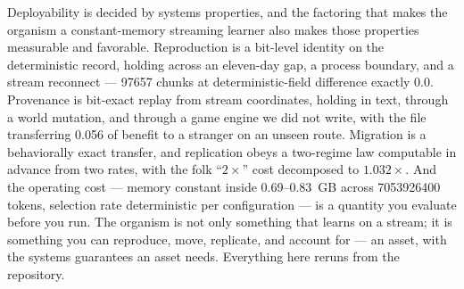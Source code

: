\documentclass[11pt]{article}
\theoremstyle{definition}
\begin{document}
Deployability is decided by systems properties, and the factoring that makes
the organism a constant-memory streaming learner also makes those properties
measurable and favorable. Reproduction is a bit-level identity on the
deterministic record, holding across an eleven-day gap, a process boundary, and
a stream reconnect --- \num{97657} chunks at deterministic-field difference
exactly \num{0.0}. Provenance is bit-exact replay from stream coordinates,
holding in text, through a world mutation, and through a game engine we did not
write, with the file transferring \num{0.056} of benefit to a stranger on an
unseen route. Migration is a behaviorally exact transfer, and replication obeys
a two-regime law computable in advance from two rates, with the folk
``$2\times$'' cost decomposed to $1.032\times$. And the operating cost ---
memory constant inside \num{0.69}--\num{0.83}~GB across \num{7053926400} tokens,
selection rate deterministic per configuration --- is a quantity you evaluate
before you run. The organism is not only something that learns on a stream; it
is something you can reproduce, move, replicate, and account for --- an asset,
with the systems guarantees an asset needs. Everything here reruns from the
repository.

{\small


}
\end{document}
